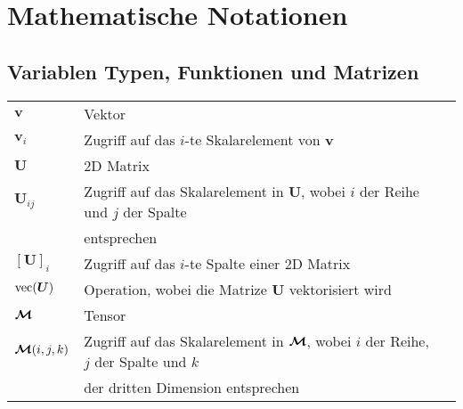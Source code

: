 \chapter*{Mathematische Notationen}

\section*{Variablen Typen, Funktionen und Matrizen}
\begin{flushleft}
\normalsize
\begin{tabular}{l l l}
$\bm{v}$ & Vektor\\
$\bm{v}_i$ & Zugriff auf das $i$-te Skalarelement von $\bm{v}$\\
$\bm{U}$ & 2D Matrix \\
$\bm{U}_{ij} $ & Zugriff auf das Skalarelement in $\bm{U}$, wobei $i$ der Reihe und $j$ der Spalte \\ & entsprechen\\ 
$[\bm{U}]_{i}$ &  Zugriff auf das $i$-te Spalte einer 2D Matrix\\
$\operatorname{vec}(\bm{U})$ & Operation, wobei die Matrize $\bm{U}$ vektorisiert wird\\
$\operatorname{\bm{\mathcal{M}}}$  & Tensor\\
$\operatorname{\bm{\mathcal{M}}}(i, j, k)$ & Zugriff auf das Skalarelement in $\operatorname{\bm{\mathcal{M}}}$, wobei $i$ der Reihe, $j$ der Spalte und $k$\\ & der dritten Dimension entsprechen \\
\end{tabular}
\end{flushleft}


